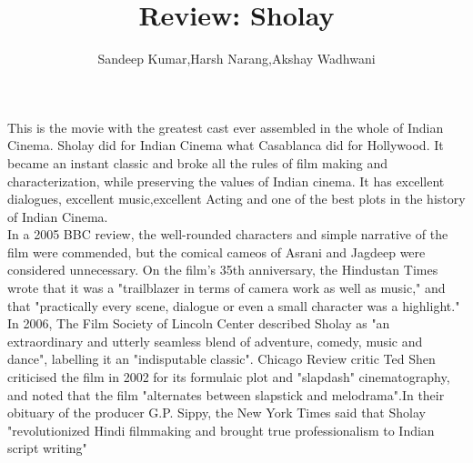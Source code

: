 \documentclass{article}
\title{Review: Sholay}
\author{Sandeep Kumar,Harsh Narang,Akshay Wadhwani}
\begin{document}
\maketitle
This is the movie with the greatest cast ever assembled in the whole of  Indian Cinema. Sholay did for Indian Cinema what Casablanca did for Hollywood. It became an instant classic and broke all the rules of film making and characterization, while preserving the values of Indian cinema. It has excellent dialogues, excellent music,excellent Acting and one of the best plots in the history of Indian Cinema.\\
In a 2005 BBC review, the well-rounded characters and simple narrative of the film were commended, but the comical cameos of Asrani and Jagdeep were considered unnecessary. On the film's 35th anniversary, the Hindustan Times wrote that it was a "trailblazer in terms of camera work as well as music," and that "practically every scene, dialogue or even a small character was a highlight." In 2006, The Film Society of Lincoln Center described Sholay as "an extraordinary and utterly seamless blend of adventure, comedy, music and dance", labelling it an "indisputable classic". Chicago Review critic Ted Shen criticised the film in 2002 for its formulaic plot and "slapdash" cinematography, and noted that the film "alternates between slapstick and melodrama".In their obituary of the producer G.P. Sippy, the New York Times said that Sholay "revolutionized Hindi filmmaking and brought true professionalism to Indian script writing"
\end{document}
